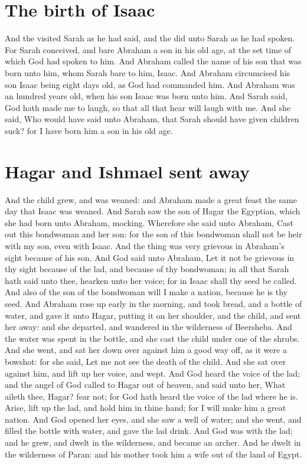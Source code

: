 \section*{The birth of Isaac}
\begin{biblechapter} %
\verse And the \LORD visited Sarah as he had said, and the \LORD did unto Sarah as he had spoken.
\verse For Sarah conceived, and bare Abraham a son in his old age, at the set time of which God had spoken to him.
\verse And Abraham called the name of his son that was born unto him, whom Sarah bare to him, Isaac.
\verse And Abraham circumcised his son Isaac being eight days old, as God had commanded him.
\verse And Abraham was an hundred years old, when his son Isaac was born unto him.
\verse And Sarah said, God hath made me to laugh, so that all that hear will laugh with me.
\verse And she said, Who would have said unto Abraham, that Sarah should have given children suck? for I have born him a son in his old age.
\section*{Hagar and Ishmael sent away}
\verse And the child grew, and was weaned: and Abraham made a great feast the same day that Isaac was weaned.
\verse And Sarah saw the son of Hagar the Egyptian, which she had born unto Abraham, mocking.
\verse Wherefore she said unto Abraham, Cast out this bondwoman and her son: for the son of this bondwoman shall not be heir with my son, even with Isaac.
\verse And the thing was very grievous in Abraham's sight because of his son.
\verse And God said unto Abraham, Let it not be grievous in thy sight because of the lad, and because of thy bondwoman; in all that Sarah hath said unto thee, hearken unto her voice; for in Isaac shall thy seed be called.
\verse And also of the son of the bondwoman will I make a nation, because he is thy seed.
\verse And Abraham rose up early in the morning, and took bread, and a bottle of water, and gave it unto Hagar, putting it on her shoulder, and the child, and sent her away: and she departed, and wandered in the wilderness of Beersheba.
\verse And the water was spent in the bottle, and she cast the child under one of the shrubs.
\verse And she went, and sat her down over against him a good way off, as it were a bowshot: for she said, Let me not see the death of the child. And she sat over against him, and lift up her voice, and wept.
\verse And God heard the voice of the lad; and the angel of God called to Hagar out of heaven, and said unto her, What aileth thee, Hagar? fear not; for God hath heard the voice of the lad where he is.
\verse Arise, lift up the lad, and hold him in thine hand; for I will make him a great nation.
\verse And God opened her eyes, and she saw a well of water; and she went, and filled the bottle with water, and gave the lad drink.
\verse And God was with the lad; and he grew, and dwelt in the wilderness, and became an archer.
\verse And he dwelt in the wilderness of Paran: and his mother took him a wife out of the land of Egypt.

\end{biblechapter}

